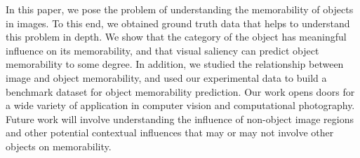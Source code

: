 In this paper, we pose the problem of understanding the memorability of objects in images. To this end, we obtained ground truth data that helps to understand this problem in depth. We show that the category of the object has meaningful influence on its memorability, and that visual saliency can predict object memorability to some degree. In addition, we studied the relationship between image and object memorability, and used our experimental data to build a benchmark dataset for object memorability prediction. Our work opens doors for a wide variety of application in computer vision and computational photography. Future work will involve understanding the influence of non-object image regions and other potential contextual influences that may or may not involve other objects on memorability. 